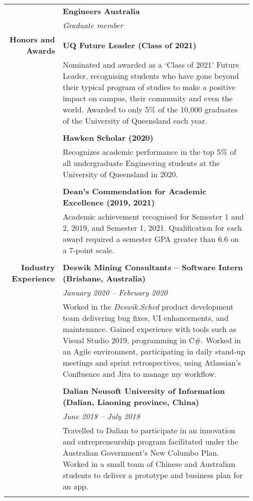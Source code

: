 \documentclass{article}
\begin{document}
\begin{longtable}{r | p{13cm}}
											& \large\textbf{Engineers Australia} \\
											& \textit{Graduate member} \\

											\pagebreak

		\large\textbf{Honors and Awards}	& \large\textbf{UQ Future Leader (Class of 2021)} \\
											& Nominated and awarded as a `Class of 2021' Future Leader, recognising students who have gone beyond their typical program of studies to make a positive impact on campus, their community and even the world. Awarded to only 5\% of the 10,000 graduates of the University of Queensland each year.  \\
											& \\

											& \large\textbf{Hawken Scholar (2020)} \\
											& Recognizes academic performance in the top 5\% of all undergraduate Engineering students at the University of Queensland in 2020. \\
											& \\
											
											& \large\textbf{Dean's Commendation for Academic Excellence (2019, 2021)} \\
											& Academic achievement recognised for Semester 1 and 2, 2019, and Semester 1, 2021. Qualification for each award required a semester GPA greater than 6.6 on a 7-point scale. \\
											& \\
											
		\large\textbf{Industry Experience} 	& \large\textbf{Deswik Mining Consultants – Software Intern (Brisbane, Australia)} \\
											& \textit{January 2020 – February 2020} \\
											& Worked in the \textit{Deswik.Sched} product development team delivering bug fixes, UI enhancements, and maintenance. Gained experience with tools such as Visual Studio 2019, programming in C\#. Worked in an Agile environment, participating in daily stand-up meetings and sprint retrospectives, using Atlassian’s Confluence and Jira to manage my workflow. \\ 
											& \\

											& \large\textbf{Dalian Neusoft University of Information (Dalian, Liaoning province, China)} \\
											& \textit{June 2018 – July 2018} \\
											& Travelled to Dalian to participate in an innovation and entrepreneurship program facilitated under the Australian Government’s New Columbo Plan. Worked in a small team of Chinese and Australian students to deliver a prototype and business plan for an app. \\
											& \\
											

\end{longtable}
\end{document}
